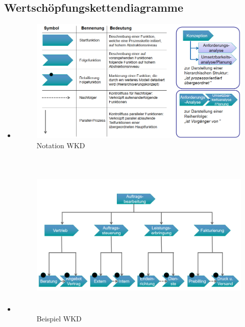 \documentclass[11pt,a4paper]{article}
\begin{document}
\subsection{Wertschöpfungskettendiagramme}
	\begin{itemize}
	\item[] 
	\begin{figure}[H]
	\includegraphics[width=18cm]{Bilder/notationwkd} 
	\caption{Notation WKD}
	\end{figure}
	\item[] 
	\begin{figure}[H]
	\includegraphics[height=8cm]{Bilder/beispielwkd}
	\caption{Beispiel WKD}
	\end{figure}
	\end{itemize}
\end{document}
